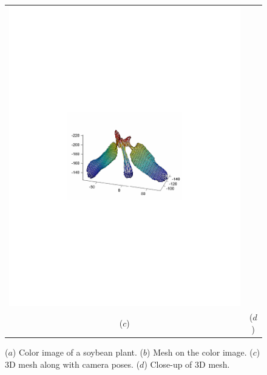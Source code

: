 \begin{figure}
\begin{center}
\begin{tabular}{cc}
\includegraphics[trim=190 280 190 290,clip,width=0.48\linewidth]{Figures/soybean3DMesh} \\
($c$) & ($d$) \\
\end{tabular}
\end{center}
   \caption{($a$) Color image of a soybean plant.  ($b$) Mesh on the color image. ($c$) $3$D mesh along with camera poses. ($d$) Close-up of $3$D mesh.  }
\label{fig:sigmainterframe}
\end{figure}



